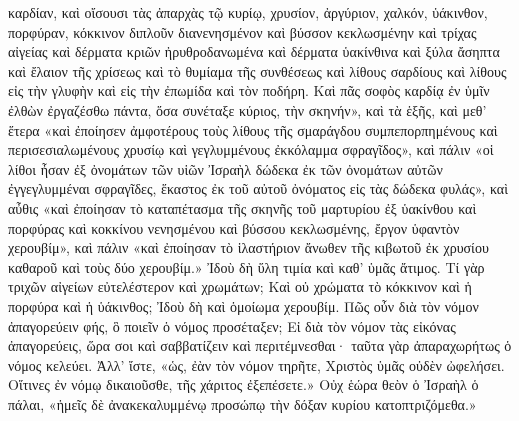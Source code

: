 \documentclass[10pt]{book}
\newcommand{\switchEnglish}{\selectlanguage{english} \switchcolumn}
\begin{document}
\begin{paracol}{2}
καρδίαν, καὶ οἴσουσι τὰς ἀπαρχὰς τῷ κυρίῳ, χρυσίον, ἀργύριον, χαλκόν,
ὑάκινθον, πορφύραν, κόκκινον διπλοῦν διανενησμένον καὶ βύσσον κεκλωσμένην καὶ
τρίχας αἰγείας καὶ δέρματα κριῶν ἠρυθροδανωμένα καὶ δέρματα ὑακίνθινα καὶ ξύλα
ἄσηπτα καὶ ἔλαιον τῆς χρίσεως καὶ τὸ θυμίαμα τῆς συνθέσεως καὶ λίθους σαρδίους
καὶ λίθους εἰς τὴν γλυφὴν καὶ εἰς τὴν ἐπωμίδα καὶ τὸν ποδήρη.  Καὶ πᾶς σοφὸς
καρδίᾳ ἐν ὑμῖν ἐλθὼν ἐργαζέσθω πάντα, ὅσα συνέταξε κύριος, τὴν σκηνήν», καὶ τὰ
ἑξῆς, καὶ μεθ’ ἕτερα «καὶ ἐποίησεν ἀμφοτέρους τοὺς λίθους τῆς σμαράγδου
συμπεπορπημένους καὶ περισεσιαλωμένους χρυσίῳ καὶ γεγλυμμένους ἐκκόλαμμα
σφραγῖδος», καὶ πάλιν «οἱ λίθοι ἦσαν ἐξ ὀνομάτων τῶν υἱῶν Ἰσραὴλ δώδεκα ἐκ τῶν
ὀνομάτων αὐτῶν ἐγγεγλυμμέναι σφραγῖδες, ἕκαστος ἐκ τοῦ αὐτοῦ ὀνόματος εἰς τὰς
δώδεκα φυλάς», καὶ αὖθις «καὶ ἐποίησαν τὸ καταπέτασμα τῆς σκηνῆς τοῦ μαρτυρίου
ἐξ ὑακίνθου καὶ πορφύρας καὶ κοκκίνου νενησμένου καὶ βύσσου κεκλωσμένης, ἔργον
ὑφαντὸν χερουβίμ», καὶ πάλιν «καὶ ἐποίησαν τὸ ἱλαστήριον ἄνωθεν τῆς κιβωτοῦ ἐκ
χρυσίου καθαροῦ καὶ τοὺς δύο χερουβίμ.» Ἰδοὺ δὴ ὕλη τιμία καὶ καθ’ ὑμᾶς
ἄτιμος.  Τί γὰρ τριχῶν αἰγείων εὐτελέστερον καὶ χρωμάτων; Καὶ οὐ χρώματα τὸ
κόκκινον καὶ ἡ πορφύρα καὶ ἡ ὑάκινθος; Ἰδοὺ δὴ καὶ ὁμοίωμα χερουβίμ.  Πῶς οὖν
διὰ τὸν νόμον ἀπαγορεύειν φής, ὃ ποιεῖν ὁ νόμος προσέταξεν; Εἰ διὰ τὸν νόμον
τὰς εἰκόνας ἀπαγορεύεις, ὥρα σοι καὶ σαββατίζειν καὶ περιτέμνεσθαι· ταῦτα γὰρ
ἀπαραχωρήτως ὁ νόμος κελεύει.  Ἀλλ’ ἴστε, «ὡς, ἐὰν τὸν νόμον τηρῆτε, Χριστὸς
ὑμᾶς οὐδὲν ὠφελήσει. Οἵτινες ἐν νόμῳ δικαιοῦσθε, τῆς χάριτος ἐξεπέσετε.» Οὐχ
ἑώρα θεὸν ὁ Ἰσραὴλ ὁ πάλαι, «ἡμεῖς δὲ ἀνακεκαλυμμένῳ προσώπῳ τὴν δόξαν κυρίου
κατοπτριζόμεθα.»

\switchEnglish


\end{paracol}
\end{document}
